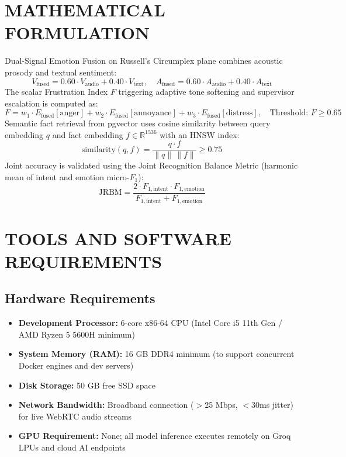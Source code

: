\documentclass[12pt,a4paper]{article}
\begin{document}
\section{MATHEMATICAL FORMULATION}
Dual-Signal Emotion Fusion on Russell's Circumplex plane combines acoustic prosody and textual sentiment:
\begin{equation}
    V_{\text{fused}} = 0.60 \cdot V_{\text{audio}} + 0.40 \cdot V_{\text{text}}, \quad A_{\text{fused}} = 0.60 \cdot A_{\text{audio}} + 0.40 \cdot A_{\text{text}}
\end{equation}
The scalar Frustration Index $F$ triggering adaptive tone softening and supervisor escalation is computed as:
\begin{equation}
    F = w_1 \cdot E_{\text{fused}}[\text{anger}] + w_2 \cdot E_{\text{fused}}[\text{annoyance}] + w_3 \cdot E_{\text{fused}}[\text{distress}], \quad \text{Threshold: } F \ge 0.65
\end{equation}
Semantic fact retrieval from pgvector uses cosine similarity between query embedding $q$ and fact embedding $f \in \mathbb{R}^{1536}$ with an HNSW index:
\begin{equation}
    \text{similarity}(q, f) = \frac{q \cdot f}{\|q\| \, \|f\|} \ge 0.75
\end{equation}
Joint accuracy is validated using the Joint Recognition Balance Metric (harmonic mean of intent and emotion micro-$F_1$):
\begin{equation}
    \text{JRBM} = \frac{2 \cdot F_{1,\text{intent}} \cdot F_{1,\text{emotion}}}{F_{1,\text{intent}} + F_{1,\text{emotion}}}
\end{equation}

\section{TOOLS AND SOFTWARE REQUIREMENTS}

\subsection{Hardware Requirements}
\begin{itemize}
    \item \textbf{Development Processor:} 6-core x86-64 CPU (Intel Core i5 11th Gen / AMD Ryzen 5 5600H minimum)
    \item \textbf{System Memory (RAM):} 16 GB DDR4 minimum (to support concurrent Docker engines and dev servers)
    \item \textbf{Disk Storage:} 50 GB free SSD space
    \item \textbf{Network Bandwidth:} Broadband connection ($>$25 Mbps, $<$30ms jitter) for live WebRTC audio streams
    \item \textbf{GPU Requirement:} None; all model inference executes remotely on Groq LPUs and cloud AI endpoints
\end{itemize}
\end{document}
